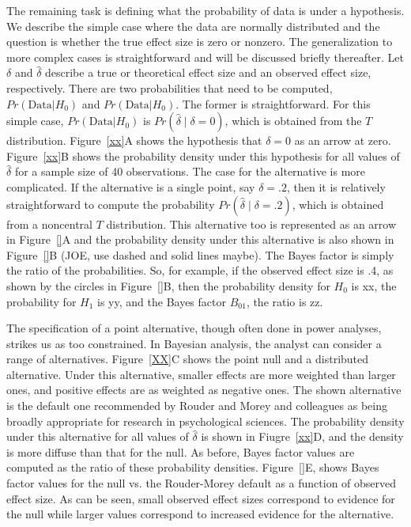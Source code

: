 \documentclass[fignum,nobf,man]{apa}
\begin{document}
The remaining task is defining what the probability of data is under a hypothesis.  We describe the simple case where the data are normally distributed and the question is whether the true effect size is zero or nonzero.  The generalization to more complex cases is straightforward and will be discussed briefly thereafter.  Let $\delta$ and $\hat{\delta}$ describe a true or theoretical effect size and an observed effect size, respectively.  There are two probabilities that need to be computed,   $Pr(\mbox{Data} | H_0)$ and $Pr(\mbox{Data} | H_0)$.   The former is straightforward.  For this simple case, $Pr(\mbox{Data} | H_0)$ is $Pr(\hat{\delta} \mid \delta=0)$, which is obtained from the $T$ distribution.  Figure~\ref{xx}A shows the hypothesis that $\delta=0$ as an arrow at zero.  Figure~\ref{xx}B shows the probability density under this hypothesis for all values of $\hat{\delta}$ for a sample size of 40 observations.  The case for the alternative is more complicated.  If the alternative is a single point, say $\delta=.2$, then it is relatively straightforward to compute the probability $Pr(\hat{\delta} \mid \delta=.2)$, which is obtained from a noncentral $T$ distribution.   This alternative too is represented as an arrow in Figure~\ref{}A and the probability density under this alternative is also shown in Figure~\ref{}B (JOE, use dashed and solid lines maybe).  The Bayes factor is simply the ratio of the probabilities.  So, for example, if the observed effect size is .4, as shown by the circles in Figure~\ref{}B, then the probability density for $H_0$ is xx, the probability for $H_1$ is yy, and the Bayes factor $B_{01}$, the ratio is zz. 

The specification of a point alternative, though often done in power analyses, strikes us as too constrained.  In Bayesian analysis, the analyst can consider a range of alternatives.  Figure~\ref{XX}C shows the point null and a distributed alternative.  Under this alternative, smaller effects are more weighted than larger ones, and positive effects are as weighted as negative ones.  The shown alternative is the default one recommended by Rouder and Morey and colleagues \citep{Rouder:etal:2009,Morey:Rouder:2011,Rouder:Morey:2012,Rouder:etal:2012} as being broadly appropriate for research in psychological sciences.  The probability density under this alternative for all values of $\hat{\delta}$ is shown in Fiugre~\ref{xx}D, and the density is more diffuse than that for the null.   As before, Bayes factor values are computed as the ratio of these probability densities.   Figure~\ref{}E, shows Bayes factor values for the null vs. the Rouder-Morey default as a function of observed effect size. As can be seen, small observed effect sizes correspond to evidence for the null while larger values correspond to increased evidence for the alternative.  
\end{document}

